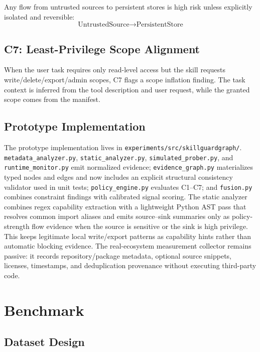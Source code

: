 \documentclass[10pt]{article}
\begin{document}
Any flow from untrusted sources to persistent stores is high risk unless explicitly isolated and reversible:
\begin{equation}
\text{UntrustedSource} \rightarrow \text{PersistentStore}
\end{equation}

\subsection{C7: Least-Privilege Scope Alignment}

When the user task requires only read-level access but the skill requests write/delete/export/admin scopes, C7 flags a scope inflation finding. The task context is inferred from the tool description and user request, while the granted scope comes from the manifest.

\subsection{Prototype Implementation}

The prototype implementation lives in \texttt{experiments/src/skillguardgraph/}.
\texttt{metadata\_analyzer.py}, \texttt{static\_analyzer.py},
\texttt{simulated\_prober.py}, and \texttt{runtime\_monitor.py} emit
normalized evidence; \texttt{evidence\_graph.py} materializes typed nodes and
edges and now includes an explicit structural consistency validator used in
unit tests; \texttt{policy\_engine.py} evaluates C1--C7; and
\texttt{fusion.py} combines constraint findings with calibrated signal scoring.
The static analyzer combines regex capability extraction with a lightweight Python AST pass that resolves common import aliases and emits source--sink summaries only as policy-strength flow evidence when the source is sensitive or the sink is high privilege. This keeps legitimate local write/export patterns as capability hints rather than automatic blocking evidence.
The real-ecosystem measurement collector remains passive: it records repository/package metadata, optional source snippets, licenses, timestamps, and deduplication provenance without executing third-party code.

\section{Benchmark}
\label{sec:benchmark}

\subsection{Dataset Design}
\end{document}
